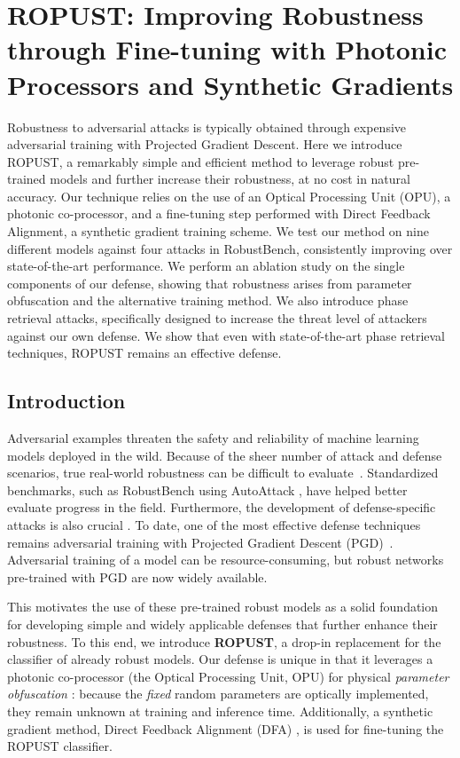 \chapter{ROPUST: Improving Robustness through Fine-tuning with Photonic Processors and Synthetic Gradients}

\label{paper:ropust}

Robustness to adversarial attacks is typically obtained through expensive adversarial training with Projected Gradient Descent. Here we introduce ROPUST, a remarkably simple and efficient method to leverage robust pre-trained models and further increase their robustness, at no cost in natural accuracy. Our technique relies on the use of an Optical Processing Unit (OPU), a photonic co-processor, and a fine-tuning step performed with Direct Feedback Alignment, a synthetic gradient training scheme. We test our method on nine different models against four attacks in RobustBench, consistently improving over state-of-the-art performance. We perform an ablation study on the single components of our defense, showing that robustness arises from parameter obfuscation and the alternative training method. We also introduce phase retrieval attacks, specifically designed to increase the threat level of attackers against our own defense. We show that even with state-of-the-art phase retrieval techniques, ROPUST remains an effective defense.

\section{Introduction}
Adversarial examples \cite{Goodfellow2015ExplainingAH} threaten the safety and reliability of machine learning models deployed in the wild. Because of the sheer number of attack and defense scenarios, true real-world robustness can be difficult to evaluate~\cite{bubeck2019adversarial}. Standardized benchmarks, such as RobustBench \cite{croce2020robustbench} using AutoAttack \cite{Croce2020ReliableEO}, have helped better evaluate progress in the field. Furthermore, the development of defense-specific attacks is also crucial \cite{tramer2019adversarial}. To date, one of the most effective defense techniques remains adversarial training with Projected Gradient Descent (PGD)~\cite{madry2017towards}. Adversarial training of a model can be resource-consuming, but robust networks pre-trained with PGD are now widely available. 

This motivates the use of these pre-trained robust models as a solid foundation for developing simple and widely applicable defenses that further enhance their robustness. To this end, we introduce \textbf{ROPUST}, a drop-in replacement for the classifier of already robust models. Our defense is unique in that it leverages a photonic co-processor (the Optical Processing Unit, OPU) for physical \emph{parameter obfuscation} \cite{Cappelli2021AdversarialRB}: because the \emph{fixed} random parameters are optically implemented, they remain unknown at training and inference time. Additionally, a synthetic gradient method, Direct Feedback Alignment (DFA) \cite{Nkland2016DirectFA}, is used for fine-tuning the ROPUST classifier. 

